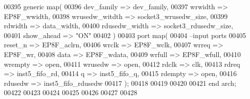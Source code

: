 \begin{DoxyCode}
00395   \textcolor{keywordflow}{generic} \textcolor{keywordflow}{map}(
00396                     dev\_family      => dev_family,
00397                     wrwidth         => EP8F_wwidth,
00398                     wrusedw\_witdth  => socket3_wrusedw_size,  
00399                     rdwidth         => data_width,
00400                     rdusedw\_width   => socket3_rdusedw_size,
00401                     show\_ahead      => \textcolor{keyword}{"ON"}
00402   \textcolor{vhdlchar}{)} 
00403   \textcolor{keywordflow}{port} \textcolor{keywordflow}{map}(
00404 \textcolor{keyword}{      --input ports }
00405       reset\_n       => EP8F_aclrn,
00406       wrclk         => EP8F_wclk,
00407       wrreq         => EP8F_wr,
00408       data          => EP8F_wdata,
00409       wrfull        => EP8F_wfull,
00410         wrempty       => \textcolor{keywordflow}{open},
00411       wrusedw       => \textcolor{keywordflow}{open},
00412       rdclk          => clk,
00413       rdreq         => inst5_fifo_rd,
00414       q             => inst5_fifo_q,
00415       rdempty       => \textcolor{keywordflow}{open},
00416       rdusedw       => inst5_fifo_rdusedw    
00417         \textcolor{vhdlchar}{)};      
00418     
00419           
00420           
00421 \textcolor{keywordflow}{end} \textcolor{vhdlchar}{arch};
00422 
00423 
00424 
00425 
00426 
00427 
00428 
\end{DoxyCode}
